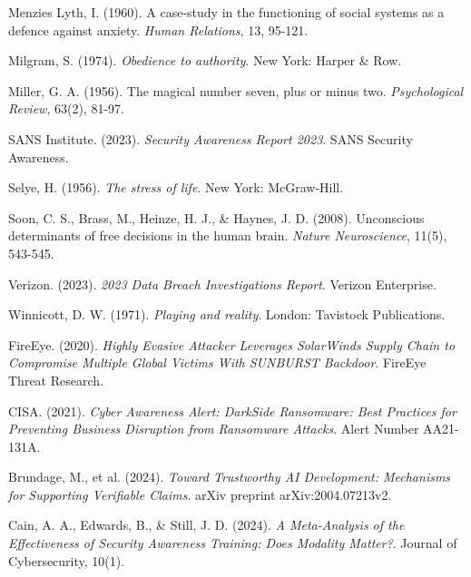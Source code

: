\documentclass[manuscript,screen,review]{acmart}
\begin{document}
\begin{thebibliography}{99}
Menzies Lyth, I. (1960). A case-study in the functioning of social systems as a defence against anxiety. \textit{Human Relations}, 13, 95-121.

Milgram, S. (1974). \textit{Obedience to authority}. New York: Harper \& Row.

Miller, G. A. (1956). The magical number seven, plus or minus two. \textit{Psychological Review}, 63(2), 81-97.

SANS Institute. (2023). \textit{Security Awareness Report 2023}. SANS Security Awareness.

Selye, H. (1956). \textit{The stress of life}. New York: McGraw-Hill.

Soon, C. S., Brass, M., Heinze, H. J., \& Haynes, J. D. (2008). Unconscious determinants of free decisions in the human brain. \textit{Nature Neuroscience}, 11(5), 543-545.

Verizon. (2023). \textit{2023 Data Breach Investigations Report}. Verizon Enterprise.

Winnicott, D. W. (1971). \textit{Playing and reality}. London: Tavistock Publications.

FireEye. (2020). \textit{Highly Evasive Attacker Leverages SolarWinds Supply Chain to Compromise Multiple Global Victims With SUNBURST Backdoor}. FireEye Threat Research.

CISA. (2021). \textit{Cyber Awareness Alert: DarkSide Ransomware: Best Practices for Preventing Business Disruption from Ransomware Attacks}. Alert Number AA21-131A.

Brundage, M., et al. (2024). \textit{Toward Trustworthy AI Development: Mechanisms for Supporting Verifiable Claims}. arXiv preprint arXiv:2004.07213v2.

Cain, A. A., Edwards, B., \& Still, J. D. (2024). \textit{A Meta-Analysis of the Effectiveness of Security Awareness Training: Does Modality Matter?}. Journal of Cybersecurity, 10(1).

\end{thebibliography}
\end{document}
